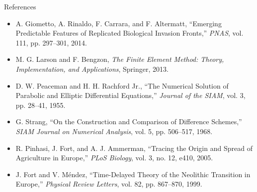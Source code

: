 \documentclass[10pt]{beamer}
\begin{document}
\begin{frame}[allowframebreaks]{References}
\begin{itemize}
        \item[\textbf{[10]}] A. Giometto, A. Rinaldo, F. Carrara, and F. Altermatt,
        ``Emerging Predictable Features of Replicated Biological Invasion Fronts,''
        \textit{PNAS}, vol. 111, pp. 297--301, 2014.

        \item[\textbf{[11]}] M. G. Larson and F. Bengzon,
        \textit{The Finite Element Method: Theory, Implementation, and Applications},
        Springer, 2013.

        \item[\textbf{[12]}] D. W. Peaceman and H. H. Rachford Jr.,
        ``The Numerical Solution of Parabolic and Elliptic Differential Equations,''
        \textit{Journal of the SIAM}, vol. 3, pp. 28--41, 1955.

        \item[\textbf{[13]}] G. Strang,
        ``On the Construction and Comparison of Difference Schemes,''
        \textit{SIAM Journal on Numerical Analysis}, vol. 5, pp. 506--517, 1968.

        \item[\textbf{[14]}] R. Pinhasi, J. Fort, and A. J. Ammerman,
        ``Tracing the Origin and Spread of Agriculture in Europe,''
        \textit{PLoS Biology}, vol. 3, no. 12, e410, 2005.

        \item[\textbf{[15]}] J. Fort and V. M\'endez,
        ``Time-Delayed Theory of the Neolithic Transition in Europe,''
        \textit{Physical Review Letters}, vol. 82, pp. 867--870, 1999.
    \end{itemize}
  \end{frame}
\end{document}
